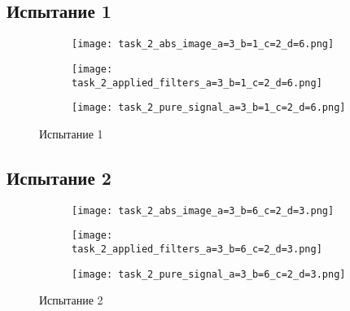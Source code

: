 \newpage
\subsection{Испытание 1}

\begin{figure}[!ht]
	\centering
\hspace*{\fill}%
	\begin{subfigure}[b]{0.30\textwidth}
        \centering
		\texttt{[image: task\_2\_abs\_image\_a=3\_b=1\_c=2\_d=6.png]}
		\caption{}
	
	\end{subfigure}
\hfill
	\begin{subfigure}[b]{0.30\textwidth}
        \centering
		\texttt{[image: task\_2\_applied\_filters\_a=3\_b=1\_c=2\_d=6.png]}
        \caption{}
		
	\end{subfigure}
\hspace*{\fill}%
\par\vspace{\abovecaptionskip}
        \begin{subfigure}[b]{0.30\textwidth}
        \centering
		\texttt{[image: task\_2\_pure\_signal\_a=3\_b=1\_c=2\_d=6.png]}
		\caption{}
	
	\end{subfigure}
	\caption{Испытание 1}
\end{figure}

\newpage
\subsection{Испытание 2}

\begin{figure}[!ht]
	\centering
\hspace*{\fill}%
	\begin{subfigure}[b]{0.30\textwidth}
        \centering
		\texttt{[image: task\_2\_abs\_image\_a=3\_b=6\_c=2\_d=3.png]}
		\caption{}
	
	\end{subfigure}
\hfill
	\begin{subfigure}[b]{0.30\textwidth}
        \centering
		\texttt{[image: task\_2\_applied\_filters\_a=3\_b=6\_c=2\_d=3.png]}
        \caption{}
		
	\end{subfigure}
\hspace*{\fill}%
\par\vspace{\abovecaptionskip}
        \begin{subfigure}[b]{0.30\textwidth}
        \centering
		\texttt{[image: task\_2\_pure\_signal\_a=3\_b=6\_c=2\_d=3.png]}
		\caption{}
	
	\end{subfigure}
	\caption{Испытание 2}
\end{figure}


